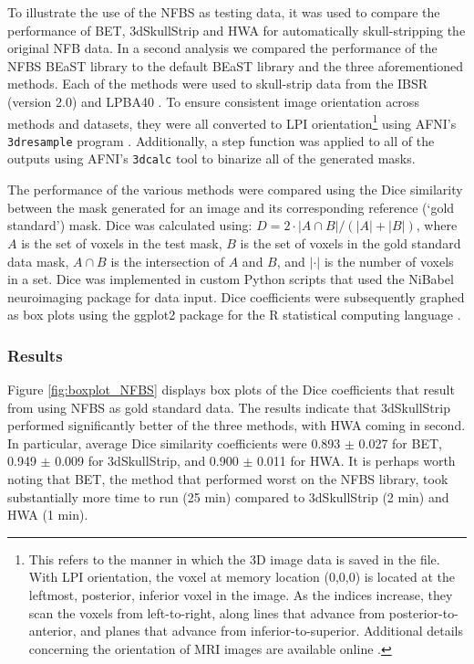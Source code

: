 To illustrate the use of the NFBS as testing data, it was used to compare the performance of BET, 3dSkullStrip and HWA for automatically skull-stripping the original NFB data. In a second analysis we compared the performance of the NFBS BEaST library to the default BEaST library and the three aforementioned methods. Each of the methods were used to skull-strip data from the IBSR (version 2.0) and LPBA40 \cite{IBSR, lpba40}. To ensure consistent image orientation across methods and datasets, they were all converted to LPI orientation\footnote{This refers to the manner in which the 3D image data is saved in the file. With LPI orientation, the voxel at memory location (0,0,0) is located at the leftmost, posterior, inferior voxel in the image. As the indices increase, they scan the voxels from left-to-right, along lines that advance from posterior-to-anterior, and planes that advance from inferior-to-superior.
Additional details concerning the orientation of MRI images are available online \cite{orientation}.} using AFNI's \texttt{3dresample} program \cite{afni}. Additionally, a step function was applied to all of the outputs using AFNI's \texttt{3dcalc} tool to binarize all of the generated masks.

\par The performance of the various methods were compared using the Dice similarity \cite{Dice1945} between the mask generated for an image and its corresponding reference (`gold standard') mask. Dice was calculated using: $D = 2 \cdot | A \cap B | / (|A| + |B|)$, where $A$ is the set of voxels in the test mask, $B$ is the set of voxels in the gold standard data mask, $A \cap B$ is the intersection of $A$ and $B$, and $|\cdot|$ is the number of voxels in a set. Dice was implemented in custom Python scripts that used the NiBabel neuroimaging package \cite{NiBabel} for data input. Dice coefficients were subsequently graphed as box plots using the ggplot2 package \cite{Wickham2009} for the R statistical computing language \cite{R}.


\subsubsection*{Results}
Figure \ref{fig:boxplot_NFBS} displays box plots of the Dice coefficients that result from using NFBS as gold standard data. The results indicate that 3dSkullStrip performed significantly better of the three methods, with HWA coming in second. In particular, average Dice similarity coefficients were 0.893 $\pm$ 0.027 for BET, 0.949 $\pm$ 0.009 for 3dSkullStrip, and 0.900 $\pm$ 0.011 for HWA. It is perhaps worth noting that BET, the method that performed worst on the NFBS library, took substantially more time to run (25 min) compared to 3dSkullStrip (2 min) and HWA (1 min).

